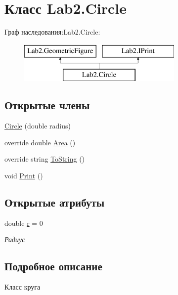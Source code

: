 \hypertarget{class_lab2_1_1_circle}{}\section{Класс Lab2.\+Circle}
\label{class_lab2_1_1_circle}
Граф наследования\+:Lab2.\+Circle\+:\begin{figure}[H]
\begin{center}
\leavevmode
\includegraphics[height=2.000000cm]{class_lab2_1_1_circle}
\end{center}
\end{figure}
\subsection*{Открытые члены}
\begin{DoxyCompactItemize}
\item 
\hyperlink{class_lab2_1_1_circle_ac95d3e44e178cf6199237fc74698465c}{Circle} (double radius)
\item 
override double \hyperlink{class_lab2_1_1_circle_afe38ef7cc9ce4b02a6e640d3029e5962}{Area} ()
\item 
override string \hyperlink{class_lab2_1_1_circle_ab2ed9c25791cb878a8a8d8857786917d}{To\+String} ()
\item 
void \hyperlink{class_lab2_1_1_circle_a300cdfbc89e35dadfdcd35ff085ffc13}{Print} ()
\end{DoxyCompactItemize}
\subsection*{Открытые атрибуты}
\begin{DoxyCompactItemize}
\item 
double \hyperlink{class_lab2_1_1_circle_a5a40103bb404c90294370219a5cec078}{r} = 0
\begin{DoxyCompactList}\small\item\em Радиус \end{DoxyCompactList}\end{DoxyCompactItemize}


\subsection{Подробное описание}
Класс круга 

